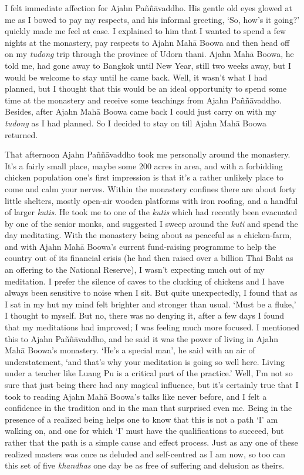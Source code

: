 I felt immediate affection for Ajahn Paññāvaddho. His gentle old eyes
glowed at me as I bowed to pay my respects, and his informal greeting,
`So, how's it going?' quickly made me feel at ease. I explained to him
that I wanted to spend a few nights at the monastery, pay respects to
Ajahn Mahā Boowa and then head off on my \emph{tudong} trip through the
province of Udorn thani. Ajahn Mahā Boowa, he told me, had gone away to
Bangkok until New Year, still two weeks away, but I would be welcome to
stay until he came back. Well, it wasn't what I had planned, but I
thought that this would be an ideal opportunity to spend some time at
the monastery and receive some teachings from Ajahn Paññāvaddho.
Besides, after Ajahn Mahā Boowa came back I could just carry on with my
\emph{tudong} as I had planned. So I decided to stay on till Ajahn Mahā
Boowa returned.

That afternoon Ajahn Paññāvaddho took me personally around the
monastery. It's a fairly small place, maybe some 200 acres in area, and
with a forbidding chicken population one's first impression is that it's
a rather unlikely place to come and calm your nerves. Within the
monastery confines there are about forty little shelters, mostly
open-air wooden platforms with iron roofing, and a handful of larger
\emph{kutis}. He took me to one of the \emph{kutis} which had recently
been evacuated by one of the senior monks, and suggested I sweep around
the \emph{kuti} and spend the day meditating. With the monastery being
about as peaceful as a chicken-farm, and with Ajahn Mahā Boowa's current
fund-raising programme to help the country out of its financial crisis
(he had then raised over a billion Thai Baht as an offering to the
National Reserve), I wasn't expecting much out of my meditation. I
prefer the silence of caves to the clucking of chickens and I have
always been sensitive to noise when I sit. But quite unexpectedly, I
found that as I sat in my hut my mind felt brighter and stronger than
usual. `Must be a fluke,' I thought to myself. But no, there was no
denying it, after a few days I found that my meditations had improved; I
was feeling much more focused. I mentioned this to Ajahn Paññāvaddho,
and he said it was the power of living in Ajahn Mahā Boowa's monastery.
`He's a special man', he said with an air of understatement, `and that's
why your meditation is going so well here. Living under a teacher like
Luang Pu is a critical part of the practice.' Well, I'm not so sure that
just being there had any magical influence, but it's certainly true that
I took to reading Ajahn Mahā Boowa's talks like never before, and I felt
a confidence in the tradition and in the man that surprised even me.
Being in the presence of a realized being helps one to know that this is
not a path `I' am walking on, and one for which `I' must have the
qualifications to succeed, but rather that the path is a simple cause
and effect process. Just as any one of these realized masters was once
as deluded and self-centred as I am now, so too can this set of five
\emph{khandhas} one day be as free of suffering and delusion as theirs.


